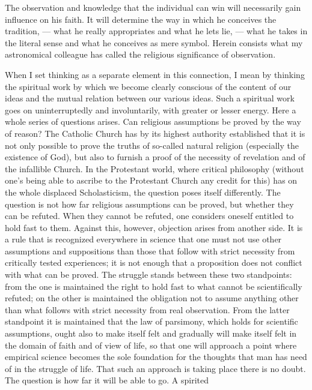 \documentclass[12pt,a4paper,openany]{book}
\newcommand{\opage}[1]{\marginnote{\footnotesize\textit{[#1]}}}
\begin{document}
The observation and knowledge that the individual can win
will necessarily gain influence on his faith. It will
determine the way in which he conceives the
tradition, --- what he really appropriates and what he lets
lie, --- what he takes in the literal sense and what
he conceives as mere symbol. Herein consists what my
astronomical colleague has called the religious significance of
observation.

When I set thinking as a separate element in
\opage{219}this connection, I mean by thinking the
spiritual work by which we become clearly conscious of the content of our
ideas and the mutual relation between our
various ideas. Such a spiritual
work goes on uninterruptedly and involuntarily, with greater or
lesser energy. Here a whole series of questions arises.
Can religious assumptions be proved by the way of reason? The
Catholic Church has by its highest authority established that
it is not only possible to prove the truths of so-called natural
religion (especially the existence of God), but also to
furnish a proof of the necessity of revelation and of the infallible Church.
In the Protestant world, where critical
philosophy (without one's being able to ascribe to the Protestant
Church any credit for this) has on the whole displaced
Scholasticism, the question poses itself differently. The question is
not how far religious assumptions can be proved, but whether
they can be refuted. When they cannot be refuted, one considers
oneself entitled to hold fast to them. Against this, however, objection
arises from another side. It is a rule that is
recognized everywhere in science that one must not use
other assumptions and suppositions than those that follow with strict
necessity from critically tested experiences; it
is not enough that a proposition does not conflict with what can be
proved. The struggle stands between these two standpoints: from
the one is maintained the right to hold fast to what cannot
be scientifically refuted; on the other is maintained the obligation
not to assume anything other than what follows with strict
necessity from real observation. From the latter
standpoint it is maintained that the law of parsimony, which
holds for scientific assumptions, ought also to make itself felt and
gradually will make itself felt in the domain of faith and
of view of life, so that one will approach a point
where empirical science becomes the sole foundation for the
thoughts that man has need of in the struggle of life. That
such an approach is taking place there is no doubt.
The question is how far it will be able to go. A spirited
\end{document}
